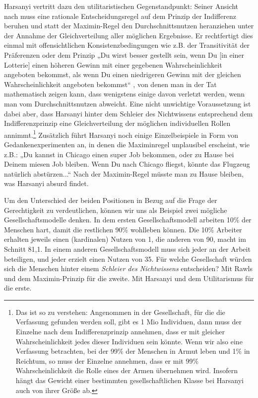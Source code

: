 Harsanyi vertritt dazu den utilitaristischen Gegenstandpunkt: Seiner Ansicht nach
muss eine rationale Entscheidungsregel auf dem Prinzip der Indifferenz beruhen
und statt der Maximin-Regel den Durchschnittsnutzen heranziehen unter der Annahme
der Gleichverteilung aller möglichen Ergebnisse. Er rechtfertigt dies einmal mit
offensichtlichen Konsistenzbedingungen wie z.B. der Transitivität der Präferenzen
oder dem Prinzip „Du wirst besser gestellt sein, wenn Du [in einer Lotterie]
einen höheren Gewinn mit einer gegebenen Wahrscheinlichkeit angeboten bekommst,
als wenn Du einen niedrigeren Gewinn mit der gleichen Wahrscheinlichkeit
angeboten bekommst“ \cite[S. 47]{harsanyi:1975}, von denen man in der Tat
mathematisch zeigen kann, dass wenigstens einige davon verletzt werden, wenn man
vom Durchschnittsnutzen abweicht. Eine nicht unwichtige Voraussetzung ist dabei
aber, dass Harsanyi hinter dem Schleier des Nichtwissens entsprechend dem
Indifferenzprinzip eine Gleichverteilung der möglichen individuellen Rollen
annimmt.\footnote{Das ist so zu verstehen: Angenommen in der Gesellschaft, für
die die Verfassung gefunden werden soll, gibt es 1 Mio Individuen, dann muss der
Einzelne nach dem Indifferenzprinzip annehmen, dass er mit gleicher
Wahrscheinlichkeit jedes dieser Individuen sein könnte. Wenn wir also eine
Verfassung betrachten, bei der 99\% der Menschen in Armut leben und 1\% in
Reichtum, so muss der Einzelne annehmen, dass er mit 99\% Wahrscheinlichkeit die
Rolle eines der Armen übernehmen wird. Insofern hängt das Gewicht einer
bestimmten gesellschaftlichen Klasse bei Harsanyi auch von ihrer Größe ab.}
Zusätzlich führt Harsanyi noch einige Einzelbeispiele in Form von Gedankenexperimenten an,
in denen die Maximinregel unplausibel erscheint, wie z.B.: „Du kannst
in Chicago einen super Job bekommen, oder zu Hause bei Deinem miesen Job bleiben.
Wenn Du nach Chicago fliegst, könnte das Flugzeug natürlich abstürzen...“ Nach
der Maximin-Regel müsste man zu Hause bleiben, was Harsanyi absurd findet.

Um den Unterschied der beiden Positionen in Bezug auf die Frage der
Gerechtigkeit zu verdeutlichen, können wir uns als Beispiel \cite[S.
41]{resnik:1987} zwei mögliche Gesellschaftsmodelle denken. In dem ersten
Gesellschaftsmodell arbeiten 10\% der Menschen hart, damit die
restlichen 90\% wohlleben können. Die 10\% Arbeiter erhalten jeweils
einen (kardinalen) Nutzen von 1, die anderen von 90, macht im Schnitt
81,1. In einem anderen Gesellschaftsmodell
muss sich jeder an der Arbeit beteiligen, und jeder erzielt einen
Nutzen von 35. Für welche Gesellschaft würden sich die Menschen
hinter einem {\em Schleier des Nichtwissens} entscheiden? Mit Rawls
und dem Maximin-Prinzip für die zweite. Mit Harsanyi und dem
Utilitarismus für die erste.


